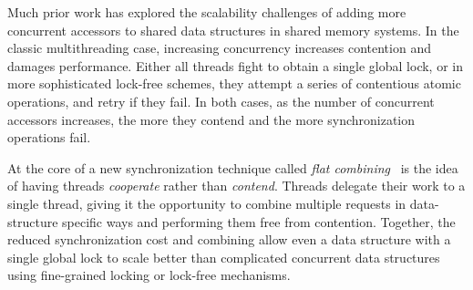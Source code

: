 Much prior work has explored the scalability challenges of adding more concurrent accessors to shared data structures in shared memory systems.
In the classic multithreading case, increasing concurrency increases contention and damages performance.
Either all threads fight to obtain a single global lock, or in more sophisticated lock-free schemes, they attempt a series of contentious atomic operations, and retry if they fail. In both cases, as the number of concurrent accessors increases, the more they contend and the more synchronization operations fail.

At the core of a new synchronization technique called \emph{flat combining}~\cite{flatCombining} is the idea of having threads \emph{cooperate} rather than \emph{contend}.
Threads delegate their work to a single thread, giving it the opportunity to combine multiple requests in data-structure specific ways and performing them free from contention.
Together, the reduced synchronization cost and combining allow even a data structure with a single global lock to scale better than complicated concurrent data structures using fine-grained locking or lock-free mechanisms.


